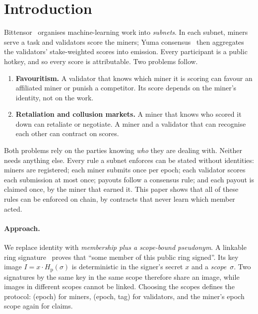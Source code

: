 \documentclass[11pt]{article}
\theoremstyle{remark}
\newcommand{\Hp}{H_{\mathrm{p}}}
\begin{document}
\section{Introduction}

Bittensor~\cite{bittensor} organises machine-learning work into \emph{subnets}. In each subnet, miners serve a task and validators score the miners; Yuma consensus~\cite{yumadocs} then aggregates the validators' stake-weighted scores into emission. Every participant is a public hotkey, and so every score is attributable. Two problems follow.

\begin{enumerate}
\item \textbf{Favouritism.} A validator that knows which miner it is scoring can favour an affiliated miner or punish a competitor. Its score depends on the miner's identity, not on the work.
\item \textbf{Retaliation and collusion markets.} A miner that knows who scored it down can retaliate or negotiate. A miner and a validator that can recognise each other can contract on scores.
\end{enumerate}

Both problems rely on the parties knowing \emph{who} they are dealing with. Neither needs anything else. Every rule a subnet enforces can be stated without identities: miners are registered; each miner submits once per epoch; each validator scores each submission at most once; payouts follow a consensus rule; and each payout is claimed once, by the miner that earned it. This paper shows that all of these rules can be enforced on chain, by contracts that never learn which member acted.

\paragraph{Approach.} We replace identity with \emph{membership plus a scope-bound pseudonym}. A linkable ring signature~\cite{lww04} proves that ``some member of this public ring signed''. Its key image $I = x\cdot \Hp(\sigma)$ is deterministic in the signer's secret $x$ and a \emph{scope}~$\sigma$. Two signatures by the same key in the same scope therefore share an image, while images in different scopes cannot be linked. Choosing the scopes defines the protocol: (epoch) for miners, (epoch, tag) for validators, and the miner's epoch scope again for claims.
\end{document}
